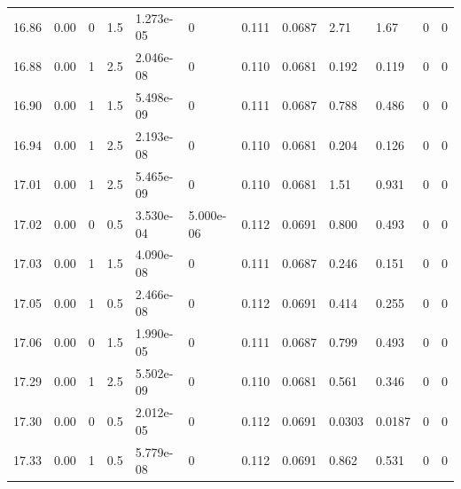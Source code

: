 \documentclass[preview]{standalone}
\begin{document}
{{{{{{{{{\begin{tabular}{L{1.2cm}C{1.2cm} C{0.3cm}C{0.5cm} C{1.4cm}C{1.4cm} C{1.4cm}C{1.4cm} C{1.6cm}C{1.6cm} C{1.6cm}C{1.6cm}}
  16.86  &  0.00  & 0     & 1.5 &  1.273e-05  & 0  &  0.111&   0.0687& 2.71 & 1.67   &  0 & 0  \\ 
  16.88  &  0.00  & 1     & 2.5 &  2.046e-08  & 0  &  0.110&   0.0681& 0.192 & 0.119   &  0 & 0  \\ 
  16.90  &  0.00  & 1     & 1.5 &  5.498e-09  & 0  &  0.111&   0.0687& 0.788 & 0.486   &  0 & 0  \\ 
  16.94  &  0.00  & 1     & 2.5 &  2.193e-08  & 0  &  0.110&   0.0681& 0.204 & 0.126   &  0 & 0  \\ 
  17.01  &  0.00  & 1     & 2.5 &  5.465e-09  & 0  &  0.110&   0.0681& 1.51 & 0.931   &  0 & 0  \\ 
  17.02  &  0.00  & 0     & 0.5 &  3.530e-04  & 5.000e-06  &  0.112&   0.0691& 0.800 & 0.493   &  0 & 0  \\ 
  17.03  &  0.00  & 1     & 1.5 &  4.090e-08  & 0  &  0.111&   0.0687& 0.246 & 0.151   &  0 & 0  \\ 
  17.05  &  0.00  & 1     & 0.5 &  2.466e-08  & 0  &  0.112&   0.0691& 0.414 & 0.255   &  0 & 0  \\ 
  17.06  &  0.00  & 0     & 1.5 &  1.990e-05  & 0  &  0.111&   0.0687& 0.799 & 0.493   &  0 & 0  \\ 
  17.29  &  0.00  & 1     & 2.5 &  5.502e-09  & 0  &  0.110&   0.0681& 0.561 & 0.346   &  0 & 0  \\ 
  17.30  &  0.00  & 0     & 0.5 &  2.012e-05  & 0  &  0.112&   0.0691& 0.0303 & 0.0187   &  0 & 0  \\ 
  17.33  &  0.00  & 1     & 0.5 &  5.779e-08  & 0  &  0.112&   0.0691& 0.862 & 0.531   &  0 & 0  \\ 
\hline 
\end{tabular} 

}}}}}}}}}
\end{document}
